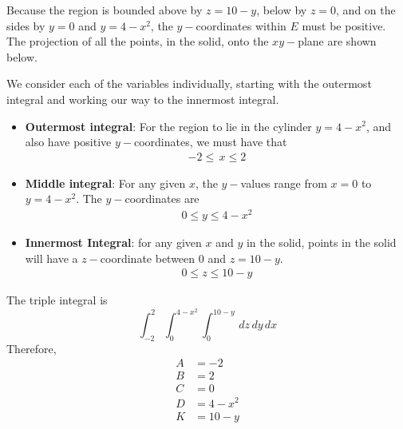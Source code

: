     \ifnum {} 
    {\color{DarkBlue} Because the region is bounded above by $z = 10-y$, below by $z=0$, and on the sides by $y=0$ and $y=4-x^2$, the $y-$coordinates within $E$ must be positive. The projection of all the points, in the solid, onto the $xy-$plane are shown below. 
        \begin{center}  
        \end{center}   
        We consider each of the variables individually, starting with the outermost integral and working our way to the innermost integral. 
    \begin{itemize}
        \item \textbf{Outermost integral}: For the region to lie in the cylinder $y=4-x^2$, and also have positive $y-$coordinates, we must have that 
        \begin{align}
            -2 \le \, x \le 2
        \end{align}
        \item \textbf{Middle integral}: 
        For any given $x$, the $y-$values range from $x=0$ to $y=4-x^2$. The $y-$coordinates are 
        \begin{align}
            0 \le y \le 4-x^2
        \end{align}
        \item \textbf{Innermost Integral}: for any given $x$ and $y$ in the solid, points in the solid will have a $z-$coordinate between $0$ and $z=10-y$. 
        \begin{align}
            0 \le z \le 10-y
        \end{align}
    \end{itemize}
    The triple integral is
    $$\displaystyle \int_{-2}^{2}\int_{0}^{4-x^2} \int_0^{10-y} \, dz \, dy \, dx$$
    Therefore,
    \begin{align}
        A &= -2 \\
        B &= 2 \\
        C &= 0\\
        D &= 4-x^2 \\
        K &= 10-y
    \end{align}

    }
   \else

   \fi
    
\fi